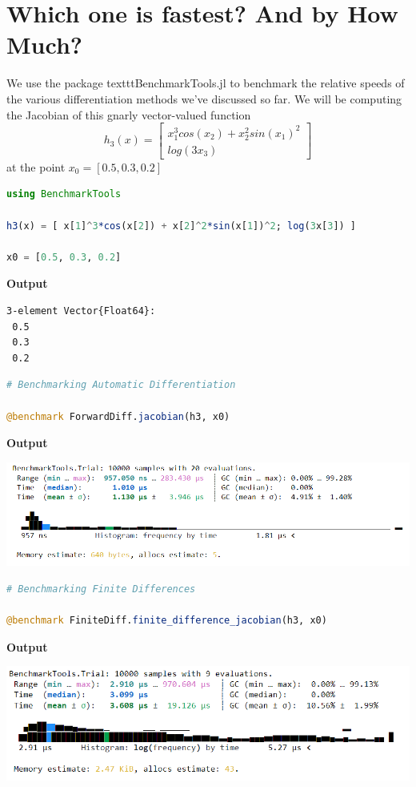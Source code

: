 \section{Which one is fastest? And by How Much?}

We use the package texttt{BenchmarkTools.jl} to benchmark the relative speeds of the various differentiation methods we've discussed so far. We will be computing the Jacobian of this gnarly vector-valued function 
$$ h_3(x) = \begin{bmatrix} x_1^3cos(x_2) + x_2^2sin(x_1)^2 \\
      log(3x_3) \end{bmatrix}$$ 
at the point $x_0 = [0.5, 0.3, 0.2]$

\begin{lstlisting}[language=Julia,style=mystyle]
using BenchmarkTools

h3(x) = [ x[1]^3*cos(x[2]) + x[2]^2*sin(x[1])^2; log(3x[3]) ]

x0 = [0.5, 0.3, 0.2]
\end{lstlisting}
\textbf{Output} 
\begin{verbatim}
3-element Vector{Float64}:
 0.5
 0.3
 0.2
\end{verbatim}

\begin{lstlisting}[language=Julia,style=mystyle]
# Benchmarking Automatic Differentiation

@benchmark ForwardDiff.jacobian(h3, x0)
\end{lstlisting}
\textbf{Output} 

\includegraphics[width=0.9\columnwidth]{graphics/Chap10/BenchmarkAutoDiff.png}

\begin{lstlisting}[language=Julia,style=mystyle]
# Benchmarking Finite Differences

@benchmark FiniteDiff.finite_difference_jacobian(h3, x0)
\end{lstlisting}
\textbf{Output} 

\includegraphics[width=0.9\columnwidth]{graphics/Chap10/BenchmarkFiniteDiff.png}

